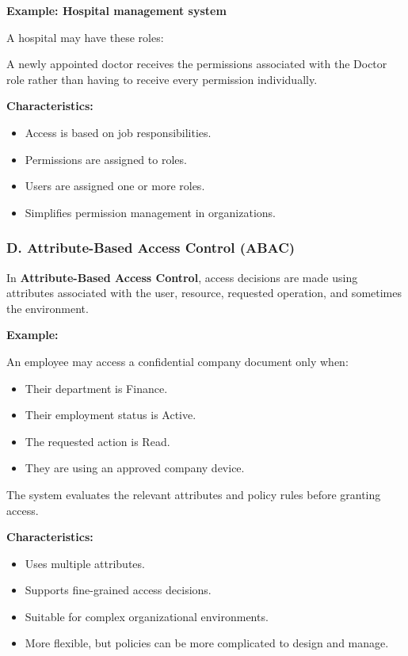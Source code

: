 \textbf{Example: Hospital management system}

A hospital may have these roles:


A newly appointed doctor receives the permissions associated with the Doctor role rather than having to receive every permission individually.

\textbf{Characteristics:}

\begin{itemize}
\item Access is based on job responsibilities.
\item Permissions are assigned to roles.
\item Users are assigned one or more roles.
\item Simplifies permission management in organizations.
\end{itemize}

\subsubsection{D. Attribute-Based Access Control (ABAC)}

In \textbf{Attribute-Based Access Control}, access decisions are made using attributes associated with the user, resource, requested operation, and sometimes the environment.

\textbf{Example:}

An employee may access a confidential company document only when:

\begin{itemize}
\item Their department is Finance.
\item Their employment status is Active.
\item The requested action is Read.
\item They are using an approved company device.
\end{itemize}

The system evaluates the relevant attributes and policy rules before granting access.

\textbf{Characteristics:}

\begin{itemize}
\item Uses multiple attributes.
\item Supports fine-grained access decisions.
\item Suitable for complex organizational environments.
\item More flexible, but policies can be more complicated to design and manage.
\end{itemize}


